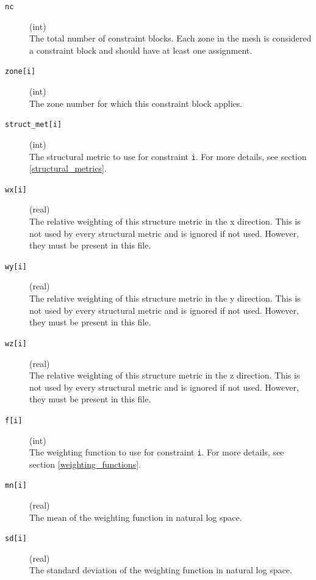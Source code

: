 \documentclass[a4paper,12pt]{article}
\begin{document}
\begin{description}
    \item[\texttt{nc}] (int)\hfill \\
     The total number of constraint blocks. Each zone in the mesh is considered a constraint block and should have at least one assignment.
    
    \item[\texttt{zone[i]}] (int)\hfill \\
     The zone number for which this constraint block applies.
    
    \item[\texttt{struct\_met[i]}] (int)\hfill \\
     The structural metric to use for constraint \texttt{i}. For more details, see section \ref{structural_metrics}.

    \item[\texttt{wx[i]}] (real)\hfill \\
    The relative weighting of this structure metric in the x direction. This is not used by every structural metric and is ignored if not used. However, they must be present in this file.

    \item[\texttt{wy[i]}] (real)\hfill \\
    The relative weighting of this structure metric in the y direction. This is not used by every structural metric and is ignored if not used. However, they must be present in this file.

    \item[\texttt{wz[i]}] (real)\hfill \\
    The relative weighting of this structure metric in the z direction. This is not used by every structural metric and is ignored if not used. However, they must be present in this file.

    \item[\texttt{f[i]}] (int)\hfill \\
     The weighting function to use for constraint \texttt{i}. For more details, see section \ref{weighting_functions}.

    \item[\texttt{mn[i]}] (real)\hfill \\
     The mean of the weighting function in natural log space.

     \item[\texttt{sd[i]}] (real)\hfill \\
     The standard deviation of the weighting function in natural log space.


\end{description}
\end{document}
